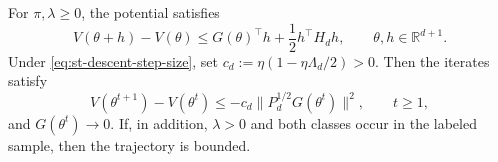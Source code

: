 \begin{lemma}
\label{lem:st-global-descent-boundedness}
For $\pi,\lambda\geq0$, the potential satisfies
\begin{equation}
    V(\theta+h)-V(\theta)
    \leq
    G(\theta)^\top h+\frac12h^\top H_dh,
    \qquad \theta,h\in\mathbb R^{d+1}.
    \label{eq:st-global-quadratic-upper-bound}
\end{equation}
Under \eqref{eq:st-descent-step-size}, set
$c_d:=\eta(1-\eta\Lambda_d/2)>0$.
Then the iterates satisfy
\begin{equation}
    V(\theta^{t+1})-V(\theta^t)
    \leq
    -c_d\|P_d^{1/2}G(\theta^t)\|^2,
    \qquad t\geq1,
    \label{eq:st-global-descent}
\end{equation}
and $G(\theta^t)\to0$.
If, in addition, $\lambda>0$ and both classes occur in the
labeled sample, then the trajectory is bounded.
\end{lemma}
